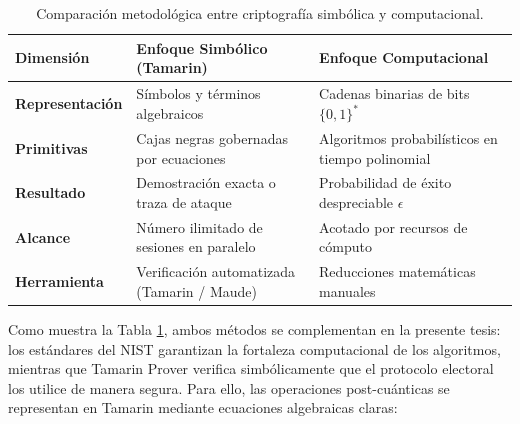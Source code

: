 \begin{table}[htbp]
	\centering
	\small
	\begin{tabular}{p{2.8cm} p{5.3cm} p{5.5cm}}
		\toprule
		\textbf{Dimensión} & \textbf{Enfoque Simbólico (Tamarin)} & \textbf{Enfoque Computacional} \\
		\midrule
		\textbf{Representación} & Símbolos y términos algebraicos & Cadenas binarias de bits $\{0, 1\}^*$ \\
		\textbf{Primitivas} & Cajas negras gobernadas por ecuaciones & Algoritmos probabilísticos en tiempo polinomial \\
		\textbf{Resultado} & Demostración exacta o traza de ataque & Probabilidad de éxito despreciable $\epsilon$ \\
		\textbf{Alcance} & Número ilimitado de sesiones en paralelo & Acotado por recursos de cómputo \\
		\textbf{Herramienta} & Verificación automatizada (Tamarin / Maude) & Reducciones matemáticas manuales \\
		\bottomrule
	\end{tabular}
	\caption{Comparación metodológica entre criptografía simbólica y computacional.}
	\label{tab:simbolico_vs_computacional}
	\par{}
\end{table}

Como muestra la Tabla \ref{tab:simbolico_vs_computacional}, ambos métodos se complementan en la presente tesis: los estándares del NIST garantizan la fortaleza computacional de los algoritmos, mientras que Tamarin Prover verifica simbólicamente que el protocolo electoral los utilice de manera segura. Para ello, las operaciones post-cuánticas se representan en Tamarin mediante ecuaciones algebraicas claras:

